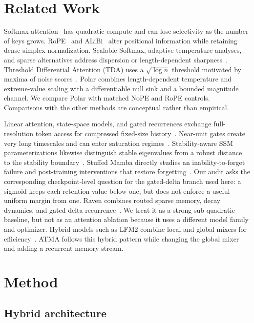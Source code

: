 \documentclass{article}
\begin{document}
\section{Related Work}

Softmax attention~\citep{Vaswani+2017} has quadratic compute and can lose selectivity as the number of keys grows. RoPE~\citep{rope2021} and ALiBi~\citep{alibi2021} alter positional information while retaining dense simplex normalization. Scalable-Softmax, adaptive-temperature analyses, and sparse alternatives address dispersion or length-dependent sharpness~\citep{nakanishi2025scalable,velickovic2025softmax,vasylenko2026sparse}. Threshold Differential Attention (TDA) uses a $\sqrt{\log n}$ threshold motivated by maxima of noise scores~\citep{huang2026threshold}. Polar combines length-dependent temperature and extreme-value scaling with a differentiable null sink and a bounded magnitude channel. We compare Polar with matched NoPE and RoPE controls. Comparisons with the other methods are conceptual rather than empirical.

Linear attention, state-space models, and gated recurrences exchange full-resolution token access for compressed fixed-size history~\citep{mamba2023,deltanet2024,yang2024gated,titans2025}. Near-unit gates create very long timescales and can enter saturation regimes~\citep{gu2020gating}. Stability-aware SSM parameterizations likewise distinguish stable eigenvalues from a robust distance to the stability boundary~\citep{wang2024stablessm}. Stuffed Mamba directly studies an inability-to-forget failure and post-training interventions that restore forgetting~\citep{chen2025stuffed}. Our audit asks the corresponding checkpoint-level question for the gated-delta branch used here: a sigmoid keeps each retention value below one, but does not enforce a useful uniform margin from one. Raven combines routed sparse memory, decay dynamics, and gated-delta recurrence~\citep{raven2026}. We treat it as a strong sub-quadratic baseline, but not as an attention ablation because it uses a different model family and optimizer. Hybrid models such as LFM2 combine local and global mixers for efficiency~\citep{lfm2_2025,physics_lms_2025}. ATMA follows this hybrid pattern while changing the global mixer and adding a recurrent memory stream.

\section{Method}

\subsection{Hybrid architecture}
\end{document}
